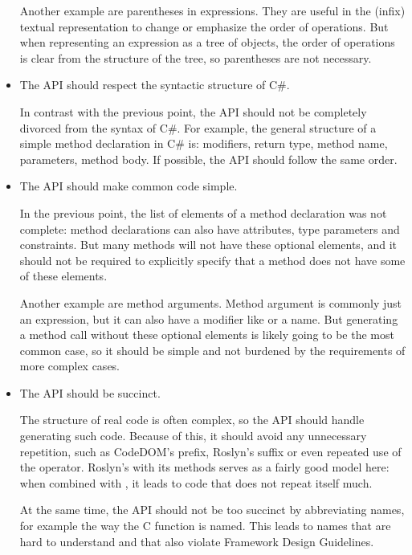 \begin{itemize}
Another example are parentheses in expressions. They are useful in the (infix) textual representation to change or emphasize the order of operations. But when representing an expression as a tree of objects, the order of operations is clear from the structure of the tree, so parentheses are not necessary.

\item The \ac{API} should respect the syntactic structure of C\#.

In contrast with the previous point, the \ac{API} should not be completely divorced from the syntax of C\#. For example, the general structure of a simple method declaration in C\# is: modifiers, return type, method name, parameters, method body. If possible, the \ac{API} should follow the same order.

\item The \ac{API} should make common code simple.

In the previous point, the list of elements of a method declaration was not complete: method declarations can also have attributes, type parameters and constraints. But many methods will not have these optional elements, and it should not be required to explicitly specify that a method does not have some of these elements.

Another example are method arguments. Method argument is commonly just an expression, but it can also have a modifier like  or a name. But generating a method call without these optional elements is likely going to be the most common case, so it should be simple and not burdened by the requirements of more complex cases.

\item The \ac{API} should be succinct.

The structure of real code is often complex, so the \ac{API} should handle generating such code. Because of this, it should avoid any unnecessary repetition, such as \ac{CodeDOM}'s  prefix, Roslyn's  suffix or even repeated use of the  operator. Roslyn's  with its  methods serves as a fairly good model here: when combined with , it leads to code that does not repeat itself much.

At the same time, the \ac{API} should not be too succinct by abbreviating names, for example the way the C function  is named. This leads to names that are hard to understand and that also violate Framework Design Guidelines. \cite{fdg-naming}


\end{itemize}

